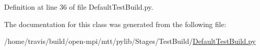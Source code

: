 Definition at line 36 of file Default\-Test\-Build.\-py.



The documentation for this class was generated from the following file\-:\begin{DoxyCompactItemize}
\item 
/home/travis/build/open-\/mpi/mtt/pylib/\-Stages/\-Test\-Build/\hyperlink{_default_test_build_8py}{Default\-Test\-Build.\-py}\end{DoxyCompactItemize}
